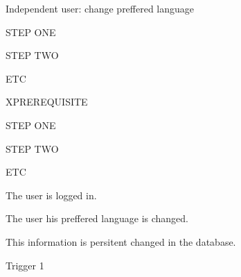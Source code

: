 \begin{uc}{Independent user: change preffered language}

    \begin{uc-mss}
    \item STEP ONE
    \item STEP TWO
    \item ETC
    \end{uc-mss}

    \begin{uc-ext}

        \begin{uc-fail}{X}{PREREQUISITE}
        \item STEP ONE
        \item STEP TWO
        \item ETC
        \end{uc-fail}

    \end{uc-ext}

    \begin{uc-pre}
    \item The user is logged in.
    \end{uc-pre}

    \begin{uc-post}
    \item The user his preffered language is changed.
    \item This information is persitent changed in the database. 
    \end{uc-post}

    \begin{uc-trig}
        Trigger 1
    \end{uc-trig}

\end{uc}

